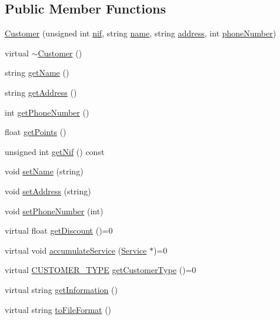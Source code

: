 \subsection*{Public Member Functions}
\begin{DoxyCompactItemize}
\item 
\hyperlink{classCustomer_a2bb6a353723debbd4f7ef22540b50b11}{Customer} (unsigned int \hyperlink{classCustomer_a65ad3329532d5ad31e36f4ac81858e31}{nif}, string \hyperlink{classCustomer_a42c1c948fa0121c82b2725826d9f8300}{name}, string \hyperlink{classCustomer_a72d87951c1b76883390d00baf044cf2c}{address}, int \hyperlink{classCustomer_ad8c8d99b4c35f66a1a87b234c6078e0f}{phone\+Number})
\item 
virtual \hyperlink{classCustomer_ab93fb14683b0393b9c900109f77c2629}{$\sim$\+Customer} ()
\item 
string \hyperlink{classCustomer_a1bda0c5a9b2f4bf0c3314832e95f2566}{get\+Name} ()
\item 
string \hyperlink{classCustomer_aebd5a3862a90a21ec56198a69dbe7f34}{get\+Address} ()
\item 
int \hyperlink{classCustomer_ab64569e18c4b32d8f18f2711a5c124e3}{get\+Phone\+Number} ()
\item 
float \hyperlink{classCustomer_a10b0bb2b55a819b80c9e14cb19a7c566}{get\+Points} ()
\item 
unsigned int \hyperlink{classCustomer_a7dfa684a44a1e83f9dfaf0db8df32e14}{get\+Nif} () const
\item 
void \hyperlink{classCustomer_a7f9fdbe148a20c2ac310ea52f0a5311f}{set\+Name} (string)
\item 
void \hyperlink{classCustomer_aa955fe10dc1855ca78353b1677f76639}{set\+Address} (string)
\item 
void \hyperlink{classCustomer_a9260f17157643a0f7e57e233f8441e9b}{set\+Phone\+Number} (int)
\item 
virtual float \hyperlink{classCustomer_a55df4714c5be2c2978069eda6bc32ace}{get\+Discount} ()=0
\item 
virtual void \hyperlink{classCustomer_ab42320f3e4d1c23e745ce901d30faf77}{accumulate\+Service} (\hyperlink{classService}{Service} $\ast$)=0
\item 
virtual \hyperlink{classCustomer_adf157cb713398bb38163743659ec3049}{C\+U\+S\+T\+O\+M\+E\+R\+\_\+\+T\+Y\+PE} \hyperlink{classCustomer_a0353fcbdcb8ec729d95e9086df828e34}{get\+Customer\+Type} ()=0
\item 
virtual string \hyperlink{classCustomer_ae13da50be281b8f266f463a2166cad66}{get\+Information} ()
\item 
virtual string \hyperlink{classCustomer_aa609cffee22046082003ea0ac3c191af}{to\+File\+Format} ()
\end{DoxyCompactItemize}
